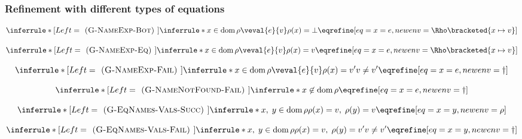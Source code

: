\documentclass[]{article}
\DeclareMathOperator{\dom}{dom}
\begin{document}
\subsubsection{Refinement with different types of equations}

\[
\inferrule*[Left=\textsc{ (G-NameExp-Bot) }]
    {\inferrule* {}
    {
    x \in \dom \rho
    \\\\
    \veval{e}{v}
    \\\\
    \rho(x) = \bot
    }}
    {\eqrefine[eq={x = e},newenv=\Rho\bracketed{x \mapsto v}]}
\]

\[
\inferrule*[Left=\textsc{ (G-NameExp-Eq) }]
    {\inferrule* {}
    {
    x \in \dom \rho
    \\\\
    \veval{e}{v}
    \\\\
    \rho(x) = v
    }}
    {\eqrefine[eq={x = e},newenv=\Rho\bracketed{x \mapsto v}]}
\]

\[
\inferrule*[Left=\textsc{ (G-NameExp-Fail) }]
    {\inferrule* {}
    {
    x \in \dom \rho
    \\\\
    \veval{e}{v}
    \\\\ 
    \rho(x) = v'
    \\\\
    v \neq v'
    }}
    {\eqrefine[eq={x = e},newenv=\dagger]}
\]

\[
\inferrule*[Left=\textsc{ (G-NameNotFound-Fail) }]
    {\inferrule* {}
    {
    x \not\in \dom \rho
    }}
    {\eqrefine[eq={x = e},newenv=\dagger]}
\]

\[
\inferrule*[Left=\textsc{ (G-EqNames-Vals-Succ) }]
    {\inferrule* {}
    {
    x,\;y \in \dom \rho
    \\\\
    \rho(x) = v, \; \rho(y) = v
    }}
    {\eqrefine[eq={x = y},newenv=\rho]}
\]

\[
\inferrule*[Left=\textsc{ (G-EqNames-Vals-Fail) }]
    {\inferrule* {}
    {
    x,\;y \in \dom \rho
    \\\\
    \rho(x) = v, \; \rho(y) = v'
    \\\\
    v \neq v'}}
    {\eqrefine[eq={x = y},newenv=\dagger]}
\]

\end{document}
